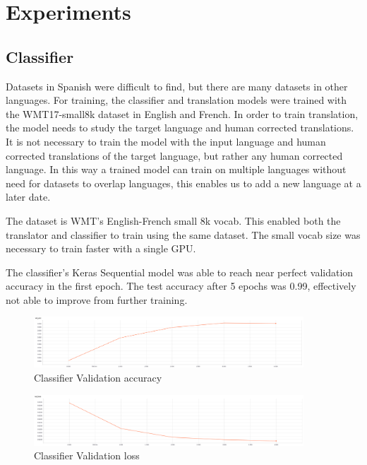 \documentclass[10pt,a4paper]{article}
\begin{document}
\clearpage


\section{Experiments}

\subsection{Classifier}
Datasets in Spanish were difficult to find, but there are many datasets in other languages. For training, the classifier and translation models were trained with the WMT17-small8k dataset in English and French. In order to train translation, the model needs to study the target language and human corrected translations. It is not necessary to train the model with the input language and human corrected translations of the target language, but rather any human corrected language. In this way a trained model can train on multiple languages without need for datasets to overlap languages, this enables us to add a new language at a later date.


The dataset is WMT's English-French small 8k vocab. This enabled both the translator and classifier to train using the same dataset. The small vocab size was necessary to train faster with a single GPU.


The classifier's Keras Sequential model was able to reach near perfect validation accuracy in the first epoch. The test accuracy after 5 epochs was 0.99, effectively not able to improve from further training.

\begin{figure}[H]
  \begin{center}
    \includegraphics[width=0.9\textwidth] {val_acc1.png}
    \caption{Classifier Validation accuracy}
  \end{center}
\end{figure}

\begin{figure}[H]
  \begin{center}
    \includegraphics[width=0.9\textwidth] {val_loss1.png}
    \caption{Classifier Validation loss}
  \end{center}
\end{figure}
\end{document}
